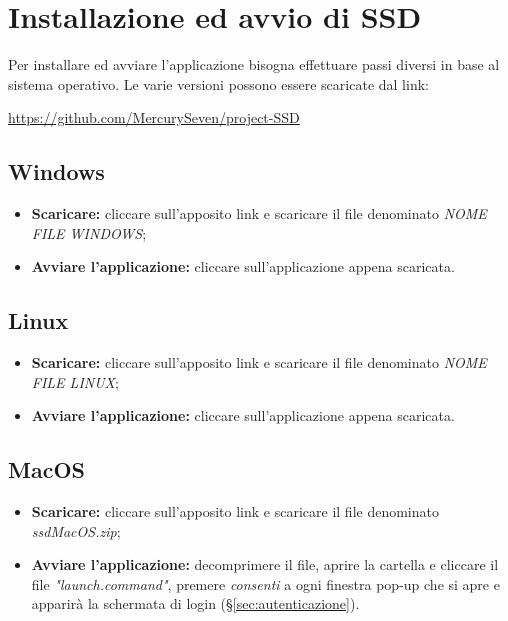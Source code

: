 \section{Installazione ed avvio di SSD}
Per installare ed avviare l'applicazione  bisogna effettuare passi diversi in base al sistema operativo. Le varie versioni possono essere scaricate dal link: \newline{}
\centerline{\url{https://github.com/MercurySeven/project-SSD}}

\subsection{Windows}
\begin{itemize}
\item \textbf{Scaricare:} cliccare sull'apposito link e scaricare il file  denominato \textit{NOME FILE WINDOWS};
\item \textbf{Avviare l'applicazione:} cliccare sull'applicazione appena scaricata.
\end{itemize}

\subsection{Linux}
\begin{itemize}
\item \textbf{Scaricare:} cliccare sull'apposito link e scaricare il file  denominato \textit{NOME FILE LINUX};
\item \textbf{Avviare l'applicazione:} cliccare sull'applicazione appena scaricata.
\end{itemize}

\subsection{MacOS}
\begin{itemize}
\item \textbf{Scaricare:} cliccare sull'apposito link e scaricare il file  denominato \textit{ssdMacOS.zip};
\item \textbf{Avviare l'applicazione:} decomprimere il file, aprire la cartella e cliccare il file \textit{"launch.command"}, premere \textit{consenti} a ogni finestra pop-up che si apre e apparirà la schermata di login (\S{}\ref{sec:autenticazione}).
\end{itemize}

